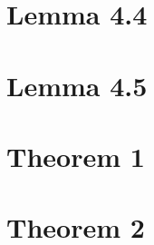 












\section{Lemma 4.4}



\section{Lemma 4.5}


\section{Theorem 1}


\section{Theorem 2}




